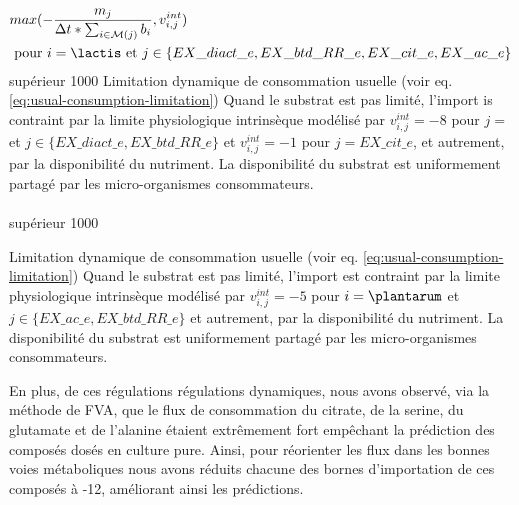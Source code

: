 \documentclass[../main.tex]{subfiles}
\begin{document}
\paragraph*{\lactis}
\begin{itemize}
{
\begin{align*}
&max(-\frac{m_{j}}{\Delta t*\sum_{i \in \mathcal{M}(j)} b_i},v^{int}_{i,j})\\
&\text{ pour }i=\text{\lactis et }j \in \{EX\_diact\_e,EX\_btd\_RR\_e,EX\_cit\_e,EX\_ac\_e\}
\end{align*}
}
{supérieur}
{1000}
{Limitation dynamique de consommation usuelle (voir eq. \eqref{eq:usual-consumption-limitation}) Quand le substrat est pas limité, l'import is contraint par la limite physiologique intrinsèque modélisé par $v^{int}_{i,j} = -8$ pour $j=$\lactis et $j \in \{EX\_diact\_e,EX\_btd\_RR\_e\}$ et 
$v^{int}_{i,j} = -1$ pour $j=EX\_cit\_e$, et autrement, par la disponibilité du nutriment. La disponibilité du substrat est uniformement partagé par les micro-organismes consommateurs.
}

\end{itemize}

\paragraph*{\plantarum}
\begin{itemize}
{supérieur}
{1000}
{

Limitation dynamique de consommation usuelle (voir eq. \eqref{eq:usual-consumption-limitation}) Quand le substrat est pas limité, l'import est contraint par la limite physiologique intrinsèque modélisé par $v^{int}_{i,j} = -5$ pour $i=\plantarum$ et $j \in \{EX\_ac\_e,EX\_btd\_RR\_e\}$ et autrement, par la disponibilité du nutriment. La disponibilité du substrat est uniformement partagé par les micro-organismes consommateurs.
}

\end{itemize}

En plus, de ces régulations régulations dynamiques, nous avons observé, via la méthode de FVA, que le flux de consommation du citrate, de la serine, du glutamate et de l'alanine étaient extrêmement fort empêchant la prédiction des composés dosés en culture pure. Ainsi, pour réorienter les flux dans les bonnes voies métaboliques nous avons réduits chacune des bornes d'importation de ces composés à -12, améliorant ainsi les prédictions. \\
\end{document}
